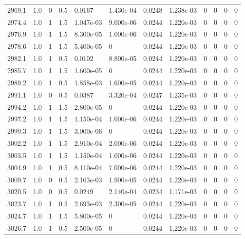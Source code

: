 \documentclass[preview]{standalone}
\begin{document}
{{{{{{{{{{{{{{{{{\begin{tabular}{L{1.2cm}C{1.2cm} C{0.3cm}C{0.5cm} C{1.4cm}C{1.4cm} C{1.4cm}C{1.4cm} C{1.6cm}C{1.6cm} C{1.6cm}C{1.6cm}}
  2969.1  &   1.0  & 0     & 0.5 &  0.0167  & 1.430e-04  &  0.0248&   1.238e-03& 0 & 0   &  0 & 0  \\ 
  2974.4  &   1.0  & 1     & 1.5 &  1.047e-03  & 9.000e-06  &  0.0244&   1.220e-03& 0 & 0   &  0 & 0  \\ 
  2976.9  &   1.0  & 1     & 1.5 &  8.300e-05  & 1.000e-06  &  0.0244&   1.220e-03& 0 & 0   &  0 & 0  \\ 
  2978.6  &   1.0  & 1     & 1.5 &  5.400e-05  & 0  &  0.0244&   1.220e-03& 0 & 0   &  0 & 0  \\ 
  2982.1  &   1.0  & 1     & 0.5 &  0.0102  & 8.800e-05  &  0.0244&   1.220e-03& 0 & 0   &  0 & 0  \\ 
  2985.7  &   1.0  & 1     & 1.5 &  1.600e-05  & 0  &  0.0244&   1.220e-03& 0 & 0   &  0 & 0  \\ 
  2989.2  &   1.0  & 1     & 0.5 &  1.858e-03  & 1.600e-05  &  0.0244&   1.220e-03& 0 & 0   &  0 & 0  \\ 
  2991.1  &   1.0  & 0     & 0.5 &  0.0387  & 3.320e-04  &  0.0247&   1.235e-03& 0 & 0   &  0 & 0  \\ 
  2994.2  &   1.0  & 1     & 1.5 &  2.800e-05  & 0  &  0.0244&   1.220e-03& 0 & 0   &  0 & 0  \\ 
  2997.2  &   1.0  & 1     & 1.5 &  1.150e-04  & 1.000e-06  &  0.0244&   1.220e-03& 0 & 0   &  0 & 0  \\ 
  2999.3  &   1.0  & 1     & 1.5 &  3.000e-06  & 0  &  0.0244&   1.220e-03& 0 & 0   &  0 & 0  \\ 
  3002.2  &   1.0  & 1     & 1.5 &  2.910e-04  & 2.000e-06  &  0.0244&   1.220e-03& 0 & 0   &  0 & 0  \\ 
  3003.5  &   1.0  & 1     & 1.5 &  1.150e-04  & 1.000e-06  &  0.0244&   1.220e-03& 0 & 0   &  0 & 0  \\ 
  3004.9  &   1.0  & 1     & 0.5 &  8.110e-04  & 7.000e-06  &  0.0244&   1.220e-03& 0 & 0   &  0 & 0  \\ 
  3009.7  &   1.0  & 0     & 0.5 &  2.163e-03  & 1.900e-05  &  0.0244&   1.220e-03& 0 & 0   &  0 & 0  \\ 
  3020.5  &   1.0  & 0     & 0.5 &  0.0249  & 2.140e-04  &  0.0234&   1.171e-03& 0 & 0   &  0 & 0  \\ 
  3023.7  &   1.0  & 1     & 0.5 &  2.693e-03  & 2.300e-05  &  0.0244&   1.220e-03& 0 & 0   &  0 & 0  \\ 
  3024.7  &   1.0  & 1     & 1.5 &  5.800e-05  & 0  &  0.0244&   1.220e-03& 0 & 0   &  0 & 0  \\ 
  3026.7  &   1.0  & 1     & 0.5 &  2.500e-05  & 0  &  0.0244&   1.220e-03& 0 & 0   &  0 & 0  \\ 

\end{tabular}}}}}}}}}}}}}}}}}}
\end{document}
